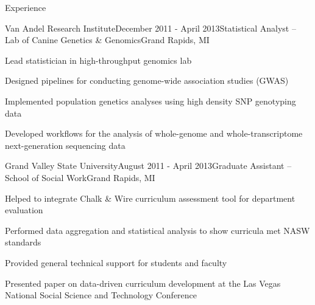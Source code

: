 \documentclass{resume} %
\begin{document}
\begin{rSection}{Experience}
\newpage


\begin{rSubsection}{Van Andel Research Institute}{December 2011 - April 2013}{Statistical Analyst -- Lab of Canine Genetics \& Genomics}{Grand Rapids, MI}
\item Lead statistician in high-throughput genomics lab
\item Designed pipelines for conducting genome-wide association studies (GWAS) 
\item Implemented population genetics analyses using high density SNP genotyping data
\item Developed workflows for the analysis of whole-genome and whole-transcriptome next-generation sequencing data
\end{rSubsection}


\begin{rSubsection}{Grand Valley State University}{August 2011 - April 2013}{Graduate Assistant -- School of Social Work}{Grand Rapids, MI}
\item Helped to integrate Chalk \& Wire curriculum assessment tool for department evaluation
\item Performed data aggregation and statistical analysis to show curricula met NASW standards
\item Provided general technical support for students and faculty
\item Presented paper on data-driven curriculum development at the Las Vegas National Social Science and Technology Conference
\end{rSubsection}

\end{rSection}

\end{document}
